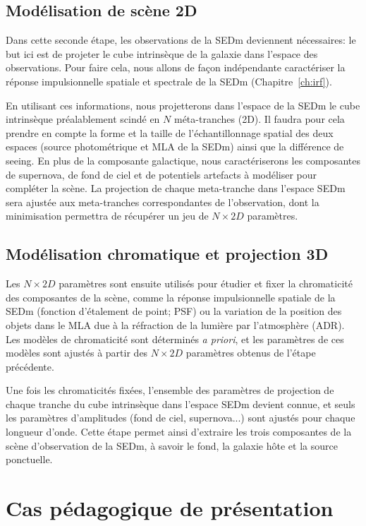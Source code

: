 \documentclass[../main/main.tex]{subfiles}
\begin{document}
\subsection{Modélisation de scène 2D}

Dans cette seconde étape, les observations de la SEDm deviennent
nécessaires: le but ici est de projeter le cube intrinsèque de la
galaxie dans l'espace des observations. Pour faire cela, nous allons de
façon indépendante caractériser la réponse impulsionnelle spatiale et
spectrale de la SEDm (Chapitre~\ref{ch:irf}).

En utilisant ces informations, nous projetterons dans l'espace de la
SEDm le cube intrinsèque préalablement scindé en $N$ méta-tranches
(2D). Il faudra pour cela prendre en compte la forme et la taille de l'échantillonnage
spatial des deux espaces (source photométrique et MLA de la SEDm) ainsi que la différence de seeing.
En plus de la composante galactique, nous caractériserons les composantes
de supernova, de fond de ciel et de potentiels artefacts à modéliser
pour compléter la scène.
La projection de chaque meta-tranche dans l'espace SEDm sera ajustée aux
meta-tranches correspondantes de l'observation, dont la minimisation permettra de récupérer un jeu de
$N\times2D$ paramètres.

\subsection{Modélisation chromatique et projection 3D}

Les $N\times2D$ paramètres sont ensuite utilisés pour étudier et fixer la chromaticité des composantes de la scène, comme la réponse impulsionnelle
spatiale de la SEDm (fonction d'étalement de point; PSF) ou la
variation de la position des objets dans le MLA due à la réfraction de
la lumière par l'atmosphère (ADR). Les modèles de chromaticité sont
déterminés \textit{a priori}, et les paramètres de ces modèles sont ajustés à
partir des $N\times2D$ paramètres obtenus de l'étape précédente.

Une fois les chromaticités fixées, l'ensemble des paramètres de projection de chaque tranche
du cube intrinsèque dans l'espace SEDm devient connue, et seuls les
paramètres d'amplitudes (fond de ciel, supernova...) sont ajustés pour
chaque longueur d'onde. Cette étape permet ainsi d'extraire les trois
composantes de la scène d'observation de la SEDm, à savoir le fond, la galaxie hôte et la
source ponctuelle.

\section{Cas pédagogique de présentation}
\end{document}
